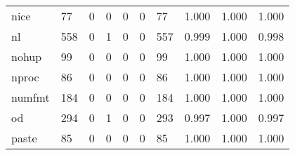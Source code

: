 \begin{longtable}{lp{1.3cm}p{1.3cm}p{1.3cm}p{1.3cm}p{1.3cm}p{1.3cm}p{1.3cm}p{1.3cm}p{1.3cm}}
nice      &                     77 &                                             0 &                                            0 &                                           0 &                                            0 &                                         77 &                                1.000 &                                  1.000 &                                1.000 \\
nl        &                    558 &                                             0 &                                            1 &                                           0 &                                            0 &                                        557 &                                0.999 &                                  1.000 &                                0.998 \\
nohup     &                     99 &                                             0 &                                            0 &                                           0 &                                            0 &                                         99 &                                1.000 &                                  1.000 &                                1.000 \\
nproc     &                     86 &                                             0 &                                            0 &                                           0 &                                            0 &                                         86 &                                1.000 &                                  1.000 &                                1.000 \\
numfmt    &                    184 &                                             0 &                                            0 &                                           0 &                                            0 &                                        184 &                                1.000 &                                  1.000 &                                1.000 \\
od        &                    294 &                                             0 &                                            1 &                                           0 &                                            0 &                                        293 &                                0.997 &                                  1.000 &                                0.997 \\
paste     &                     85 &                                             0 &                                            0 &                                           0 &                                            0 &                                         85 &                                1.000 &                                  1.000 &                                1.000 \\

\end{longtable}
